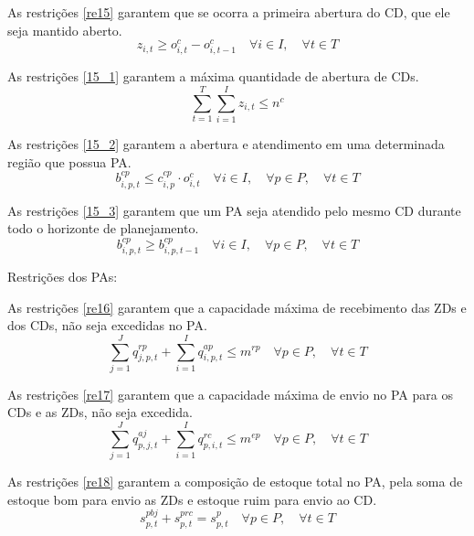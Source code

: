 As restrições \ref{re15} garantem que se ocorra a primeira abertura do CD, que ele seja mantido aberto.
\begin{equation}\label{re15}
z_{i,t} \geq o^{c}_{i,t} - o^{c}_{i,t-1} \quad \forall i \in I, \quad \forall t \in T
\end{equation}

As restrições \ref{15_1} garantem a máxima quantidade de abertura de CDs.
\begin{equation}\label{15_1}
\sum_{t=1}^{T}\sum_{i=1}^{I} z_{i,t} \leq n^{c}
\end{equation}

As restrições \ref{15_2} garantem a abertura e atendimento em uma determinada região que possua PA.
\begin{equation}\label{15_2}
b^{cp}_{i,p,t} \leq c^{cp}_{i,p} \cdot o^{c}_{i, t} \quad \forall i \in I, \quad \forall p \in P, \quad \forall t \in T
\end{equation}

As restrições \ref{15_3} garantem que um PA seja atendido pelo mesmo CD durante todo o horizonte de planejamento.
\begin{equation}\label{15_3}
b^{cp}_{i,p,t} \geq b^{cp}_{i,p,t-1} \quad \forall i \in I, \quad \forall p \in P, \quad \forall t \in T
\end{equation}


Restrições dos PAs:

As restrições \ref{re16} garantem que a capacidade máxima de recebimento das ZDs e dos CDs, não seja excedidas no PA.
\begin{equation} \label{re16}
\sum_{j=1}^{J} q^{rp}_{j,p,t} + \sum_{i=1}^{I} q^{ap} _{i,p,t} \leq m^{rp} \quad \forall p \in P, \quad \forall t \in T
\end{equation}

As restrições \ref{re17} garantem que a capacidade máxima de envio no PA para os CDs e as ZDs, não seja excedida.
\begin{equation}\label{re17}
\sum_{j=1}^{J} q^{aj}_{p,j,t} + \sum_{i=1}^{I} q^{rc}_{p,i,t} \leq m^{ep} \quad \forall p \in P, \quad \forall t \in T
\end{equation}

As restrições \ref{re18} garantem a composição de estoque total no PA, pela soma de estoque bom para envio as ZDs e estoque ruim para envio ao CD.
\begin{equation}\label{re18}
s^{pbj}_{p,t} + s^{prc}_{p,t} = s^{p}_{p,t} \quad \forall p \in P, \quad \forall t \in T
\end{equation}

